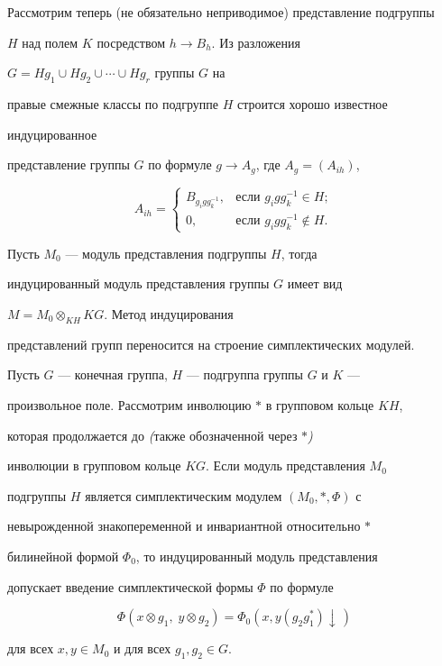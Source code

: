 Рассмотрим теперь (не обязательно неприводимое) представление подгруппы


$H$ над полем $K$ посредством $h\to B_h$. Из разложения


$G=Hg_1\cup Hg_2\cup\dotsb\cup Hg_r$ группы $G$ на


правые смежные классы по подгруппе $H$ строится хорошо известное


индуцированное


представление группы $G$ по формуле $g\to A_g$, где $A_g=(A_{ih})$,


$$


A_{ih}=


\begin{cases}


B_{g_i gg^{-1}_k}, & \text{если }g_i gg^{-1}_k\in H;\\


0, & \text{если }g_i gg^{-1}_k\notin H.


\end{cases}


$$


Пусть $M_0$ --- модуль представления подгруппы $H$, тогда


индуцированный модуль представления группы $G$ имеет вид


$M=M_0\otimes_{KH} KG$. Метод индуцирования


представлений групп переносится на строение симплектических модулей.





\begin{thm}


Пусть $G$ --- конечная группа, $H$ --- подгруппа группы $G$ и $K$ ---


произвольное поле. Рассмотрим инволюцию $*$ в групповом кольце $KH$,


которая продолжается до {\em (}также обозначенной через $*${\em )}


инволюции в групповом кольце $KG$. Если модуль представления $M_0$


подгруппы $H$ является симплектическим модулем $(M_0,*,\Phi)$ с


невырожденной знакопеременной и инвариантной относительно $*$


билинейной формой $\Phi_0$, то индуцированный модуль представления


допускает введение симплектической формы $\Phi$ по формуле


$$


\Phi(x\otimes g_1,\;y\otimes g_2)=\Phi_0(x,y(g_2g^*_1)\downarrow\,)


$$


для всех $x,y\in M_0$ и для всех $g_1,g_2\in G$.


\end{thm}





